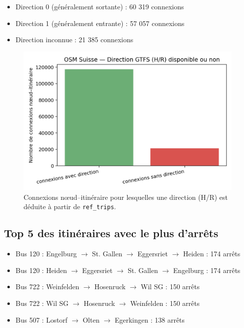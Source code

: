 \begin{itemize}
    \item Direction 0 (généralement sortante) : 60 319 connexions  
    \item Direction 1 (généralement entrante) : 57 057 connexions  
    \item Direction inconnue : 21 385 connexions  
\end{itemize}

\begin{figure}[H]
  \centering
  \includegraphics[width=.6\linewidth]{figures/plots/osm_direction_known_ratio.png}
  \caption[Directions H/R connues]{Connexions nœud–itinéraire pour lesquelles une direction (H/R) est déduite à partir de \texttt{ref\_trips}.}
  \label{fig:osm_direction_known_ratio_inline}
\end{figure}


\subsection{Top 5 des itinéraires avec le plus d’arrêts}

\begin{itemize}
    \item Bus 120 : Engelburg $\rightarrow$ St. Gallen $\rightarrow$ Eggersriet $\rightarrow$ Heiden : 174 arrêts  
    \item Bus 120 : Heiden $\rightarrow$ Eggersriet $\rightarrow$ St. Gallen $\rightarrow$ Engelburg : 174 arrêts  
    \item Bus 722 : Weinfelden $\rightarrow$ Hosenruck $\rightarrow$ Wil SG : 150 arrêts  
    \item Bus 722 : Wil SG $\rightarrow$ Hosenruck $\rightarrow$ Weinfelden : 150 arrêts  
    \item Bus 507 : Lostorf $\rightarrow$ Olten $\rightarrow$ Egerkingen : 138 arrêts  
\end{itemize}


